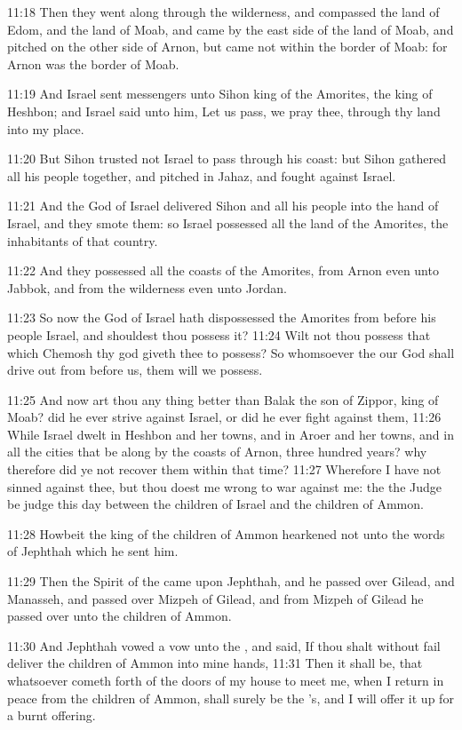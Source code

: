 11:18 Then they went along through the wilderness, and compassed the
land of Edom, and the land of Moab, and came by the east side of the
land of Moab, and pitched on the other side of Arnon, but came not
within the border of Moab: for Arnon was the border of Moab.

11:19 And Israel sent messengers unto Sihon king of the Amorites, the
king of Heshbon; and Israel said unto him, Let us pass, we pray thee,
through thy land into my place.

11:20 But Sihon trusted not Israel to pass through his coast: but
Sihon gathered all his people together, and pitched in Jahaz, and
fought against Israel.

11:21 And the \LORD God of Israel delivered Sihon and all his people
into the hand of Israel, and they smote them: so Israel possessed all
the land of the Amorites, the inhabitants of that country.

11:22 And they possessed all the coasts of the Amorites, from Arnon
even unto Jabbok, and from the wilderness even unto Jordan.

11:23 So now the \LORD God of Israel hath dispossessed the Amorites
from before his people Israel, and shouldest thou possess it?  11:24
Wilt not thou possess that which Chemosh thy god giveth thee to
possess? So whomsoever the \LORD our God shall drive out from before
us, them will we possess.

11:25 And now art thou any thing better than Balak the son of Zippor,
king of Moab? did he ever strive against Israel, or did he ever fight
against them, 11:26 While Israel dwelt in Heshbon and her towns, and
in Aroer and her towns, and in all the cities that be along by the
coasts of Arnon, three hundred years? why therefore did ye not recover
them within that time?  11:27 Wherefore I have not sinned against
thee, but thou doest me wrong to war against me: the \LORD the Judge be
judge this day between the children of Israel and the children of
Ammon.

11:28 Howbeit the king of the children of Ammon hearkened not unto the
words of Jephthah which he sent him.

11:29 Then the Spirit of the \LORD came upon Jephthah, and he passed
over Gilead, and Manasseh, and passed over Mizpeh of Gilead, and from
Mizpeh of Gilead he passed over unto the children of Ammon.

11:30 And Jephthah vowed a vow unto the \LORD, and said, If thou shalt
without fail deliver the children of Ammon into mine hands, 11:31 Then
it shall be, that whatsoever cometh forth of the doors of my house to
meet me, when I return in peace from the children of Ammon, shall
surely be the \LORD's, and I will offer it up for a burnt offering.

